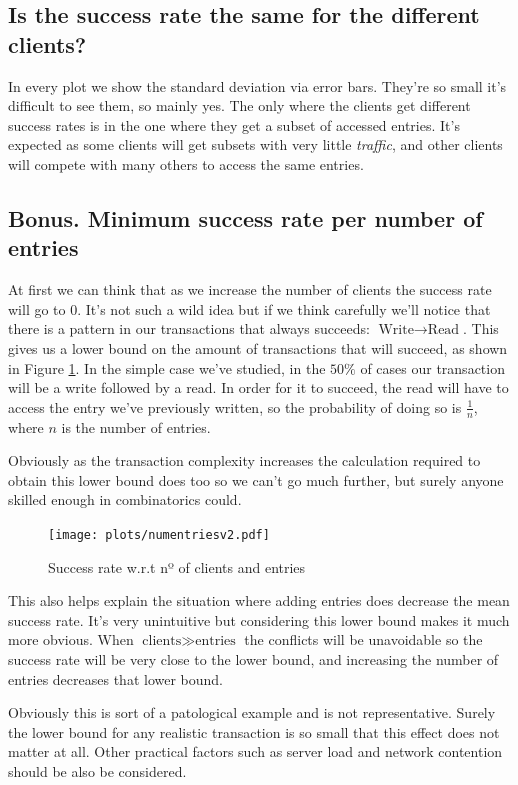 \documentclass[a4paper, 10pt]{article}
\begin{document}
\subsection{Is the success rate the same for the different clients?}
In every plot we show the standard deviation via error bars. They're so small it's difficult to see them, so mainly yes. The only where the clients get different success rates is in the one where they get a subset of accessed entries. It's expected as some clients will get subsets with very little \textit{traffic}, and other clients will compete with many others to access the same entries.

\clearpage
\subsection{Bonus. Minimum success rate per number of entries}
\label{sec:magia}
At first we can think that as we increase the number of clients the success rate will go to $0$. It's not such a wild idea but if we think carefully we'll notice that there is a pattern in our transactions that always succeeds: $\text{Write} \rightarrow \text{Read}$. This gives us a lower bound on the amount of transactions that will succeed, as shown in Figure \ref{fig:magia}. In the simple case we've studied, in the $50\%$ of cases our transaction will be a write followed by a read. In order for it to succeed, the read will have to access the entry we've previously written, so the probability of doing so is $\frac{1}{n}$, where $n$ is the number of entries.

Obviously as the transaction complexity increases the calculation required to obtain this lower bound does too so we can't go much further, but surely anyone skilled enough in combinatorics could.
\begin{figure}[H]
  \centering
  \texttt{[image: plots/numentriesv2.pdf]}
    \caption{Success rate w.r.t nº of clients and entries}
    \label{fig:magia}
\end{figure} 

This also helps explain the situation where adding entries does decrease the mean success rate. It's very unintuitive but considering this lower bound makes it much more obvious. When $\text{clients} \gg \text{entries}$ the conflicts will be unavoidable so the success rate will be very close to the lower bound, and increasing the number of entries decreases that lower bound.

Obviously this is sort of a patological example and is not representative. Surely the lower bound for any realistic transaction is so small that this effect does not matter at all. Other practical factors such as server load and network contention should be also be considered.
\clearpage
\end{document}
